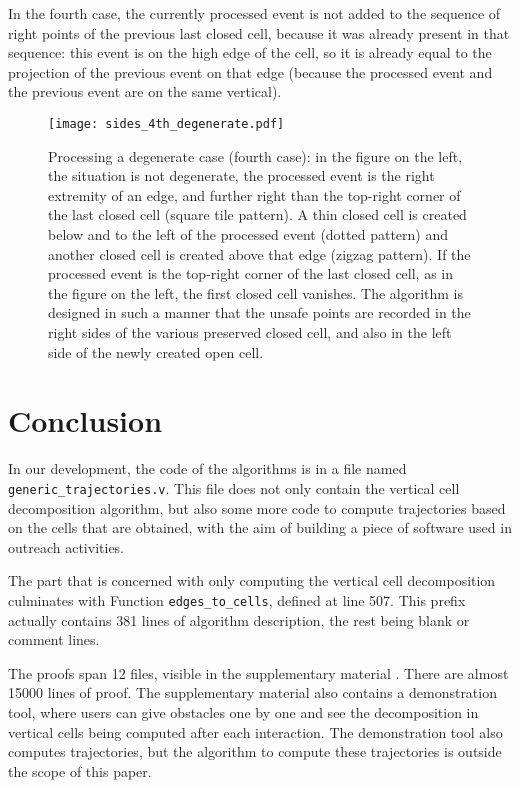 \documentclass[a4paper, USenglish, cleveref, autoref, thm-restate, final]{lipics-v2021}
\begin{document}
In the fourth case, the currently processed event is not added to the
sequence of right points of the previous last closed cell, because it
was already present in that sequence: this event is on the high edge of
the cell, so it is already equal to the projection of the previous event
on that edge (because the processed event and the previous event are on
the same vertical).

\begin{figure}
\begin{center}
\texttt{[image: sides\_4th\_degenerate.pdf]}
\end{center}
\caption{Processing a degenerate case (fourth case):
  in the figure on the left, the situation is not degenerate, the
   processed event is the right extremity
  of an edge, and further right than the top-right corner of the last
  closed cell (square tile pattern).
  A   thin closed cell is created below and to the left of the processed
  event (dotted pattern) and another closed cell
  is created above that edge (zigzag pattern).  If the processed event
  is the top-right corner of the last closed cell, as in the figure on
  the left, the first closed
  cell vanishes.  The algorithm is designed in such a manner that the
  unsafe points are recorded in the right sides of the various
  preserved closed cell, and also in the left side of the newly
  created open cell.
  }
\label{fig:third_case_degenerate}
\end{figure}
\section{Conclusion}
In our development, the code of the algorithms is in a
file named {\tt generic\_trajectories.v}.  This file does not only contain
the vertical cell decomposition algorithm, but also some more code to compute
trajectories based on the cells that are obtained, with the aim of building
a piece of software used in outreach activities.

The part that is concerned with only computing the vertical cell decomposition
culminates with Function {\tt edges\_to\_cells}, defined at line 507.
This prefix actually contains 381 lines of algorithm description, the
rest being blank or comment lines.

The proofs span 12 files, visible in the supplementary material \cite{suppl_material}.
There are almost 15000 lines of proof.  The supplementary material also
contains a demonstration tool, where users can give obstacles one by one
and see the decomposition in vertical cells being computed after each
interaction.  The demonstration tool also computes trajectories, but the
algorithm to compute these trajectories is outside the scope of this paper.
\end{document}
